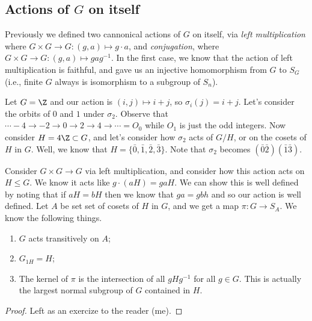 \subsection{Actions of \texorpdfstring{$G$}{G} on itself}

Previously we defined two cannonical actions of $G$ on itself, via \emph{left multiplication} where $G \times G \to G : (g,a) \mapsto g\cdot a$, and \emph{conjugation}, where $G \times G \to G : (g,a) \mapsto gag^{-1}$. In the first case, we know that the action of left multiplication is faithful, and gave us an injective homomorphism from $G$ to $S_G$ (i.e., finite $G$ always is isomorphism to a subgroup of $S_n$).

\begin{example}
Let $G = \Z$ and our action is $(i,j) \mapsto i+j$, so $\sigma_i(j) = i+j$. Let's consider the orbits of $0$ and $1$ under $\sigma_2$. Observe that $\cdots -4 \to -2 \to 0 \to 2 \to 4 \to \cdots = O_0$ while $O_1$ is just the odd integers. Now consider $H = 4\Z \subset G$, and let's consider  how $\sigma_2$ acts of $G/H$, or on the cosets of $H$ in $G$. Well, we know that $H = \{\bar{0}, \bar{1},\bar{2},\bar{3}\}$. Note that $\sigma_2$ becomes $(\bar{0}\bar{2})(\bar{1}\bar{3})$.
\end{example}

\begin{theorem}
Consider $G \times G \to G$ via left multiplication, and consider how this action acts on $H \leq G$. We know it acts like $g \cdot (aH) = gaH$. We can show this is well defined by noting that if $aH = bH$ then we know that $ga = gbh$ and so our action is well defined. Let $A$ be set set of cosets of $H$ in $G$, and we get a map $\pi : G \to S_A$. We know the following things.
\begin{enumerate}
\item $G$ acts transitively on $A$;
\item $G_{1H} = H$;
\item The kernel of $\pi$ is the intersection of all $gHg^{-1}$ for all $g \in G$. This is actually the largest normal subgroup of $G$ contained in $H$.
\end{enumerate}
\end{theorem}

\begin{proof}
Left as an exercize to the reader (me).
\end{proof}